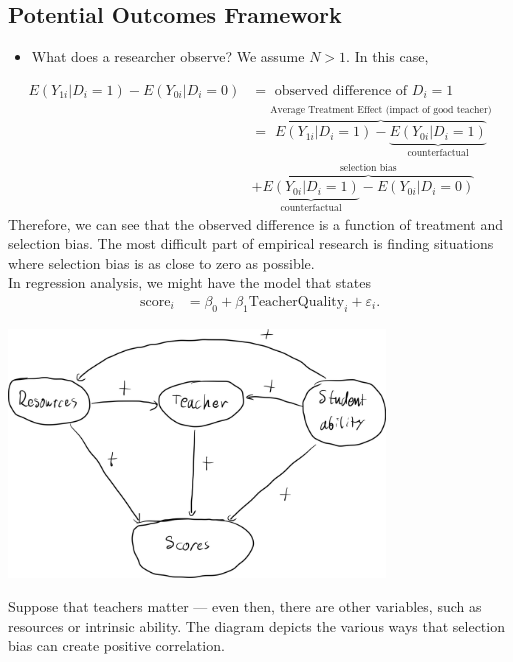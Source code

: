 \documentclass[10pt]{extarticle}
\begin{document}
  \subsection{Potential Outcomes Framework}%
  \begin{itemize}
    \item What does a researcher observe? We assume $N>1$. In this case, 
  \end{itemize}
  \begin{align*}
    E(Y_{1i}|D_i=1) - E(Y_{0i}|D_i=0) &= \text{ observed difference of $D_i = 1$ }\\
                                      &= \overbrace{E(Y_{1i}|D_i = 1) - \underbrace{E(Y_{0i}|D_i=1)}_{\text{counterfactual}}}^{\text{Average Treatment Effect (impact of good teacher)}}\\
                                      &+ \overbrace{\underbrace{E(Y_{0i}|D_i=1)}_{\text{counterfactual}} - E(Y_{0i}|D_i=0)}^{\text{selection bias}}
  \end{align*}
  Therefore, we can see that the observed difference is a function of treatment and selection bias. The most difficult part of empirical research is finding situations where selection bias is as close to zero as possible.\\

  In regression analysis, we might have the model that states
  \begin{align*}
    \text{score}_i &= \beta_0 + \beta_1\text{TeacherQuality}_i + \varepsilon_i.
  \end{align*}
  \begin{center}
    \includegraphics[width=10cm]{images/test_score_variables.png}
  \end{center}
  Suppose that teachers matter --- even then, there are other variables, such as resources or intrinsic ability. The diagram depicts the various ways that selection bias can create positive correlation.\\
\end{document}

